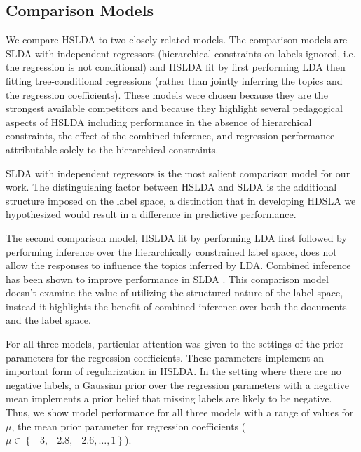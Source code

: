 \subsection{Comparison Models}

We compare HSLDA to two closely related models. The comparison models are SLDA with independent
regressors (hierarchical constraints on labels ignored,  i.e. the regression is not conditional) and HSLDA fit by first
performing LDA then fitting tree-conditional regressions (rather than jointly inferring the topics and the regression coefficients). These models were
chosen because they are the strongest available competitors and because they  highlight several pedagogical aspects of HSLDA including performance in the
absence  of hierarchical constraints, the effect of the combined inference, and
regression performance attributable solely to the hierarchical constraints.

SLDA with independent regressors is the most salient comparison model
for our work. The distinguishing factor between HSLDA and SLDA is the
additional structure imposed on the label space, a distinction that in developing HDSLA we
hypothesized would result in a difference in predictive performance. 

 The second comparison model, HSLDA fit by performing LDA first
followed by performing inference over the hierarchically constrained label
space, does not allow
the responses to influence the topics inferred by LDA.
Combined inference has been shown to improve performance in SLDA
\cite{BleiMcAuliffe2008}. This comparison model doesn't examine the value of utilizing the structured nature 
of the label space, instead it highlights the benefit of combined inference over both the
documents and the label space. 


For all three models, particular attention was given to the settings of the 
prior parameters for the regression coefficients. These parameters implement an
important form of regularization in HSLDA. In the setting where there are no
negative labels, a Gaussian prior over the regression parameters with a
negative mean implements a prior belief that missing labels are likely to be
negative. Thus, we show model performance for all three models with a
range of values for $\mu$, the mean prior parameter for regression coefficients 
($\mu\in\left\{ -3,-2.8,-2.6,\ldots,1\right\}$).

